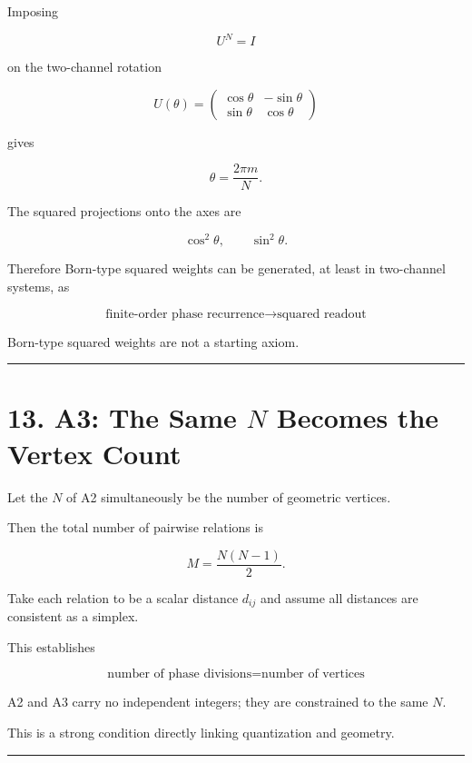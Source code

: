 \documentclass[
  a4paper,
]{article}
\begin{document}
Imposing

\[
U^N=I
\]

on the two-channel rotation

\[
U(\theta)
=
\begin{pmatrix}
\cos\theta&-\sin\theta\\
\sin\theta&\cos\theta
\end{pmatrix}
\]

gives

\[
\theta=\frac{2\pi m}{N}.
\]

The squared projections onto the axes are

\[
\boxed{
\cos^2\theta,\qquad\sin^2\theta
}.
\]

Therefore Born-type squared weights can be generated, at least in
two-channel systems, as

\[
\boxed{
\text{finite-order phase recurrence}
\to
\text{squared readout}
}
\]

Born-type squared weights are not a starting axiom.

\begin{center}\rule{0.5\linewidth}{0.5pt}\end{center}

\section{\texorpdfstring{13. A3: The Same \(N\) Becomes the Vertex
Count}{13. A3: The Same N Becomes the Vertex Count}}\label{a3-the-same-n-becomes-the-vertex-count}

Let the \(N\) of A2 simultaneously be the number of geometric vertices.

Then the total number of pairwise relations is

\[
\boxed{
M=\frac{N(N-1)}2
}.
\]

Take each relation to be a scalar distance \(d_{ij}\) and assume all
distances are consistent as a simplex.

This establishes

\[
\boxed{
\text{number of phase divisions}
=
\text{number of vertices}
}
\]

A2 and A3 carry no independent integers; they are constrained to the
same \(N\).

This is a strong condition directly linking quantization and geometry.

\begin{center}\rule{0.5\linewidth}{0.5pt}\end{center}
\end{document}
